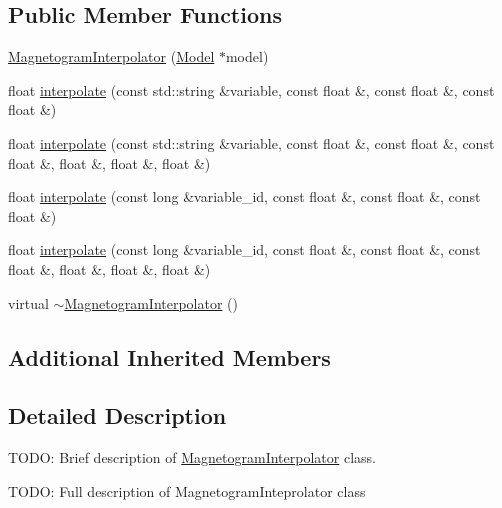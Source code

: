 \subsection*{Public Member Functions}
\begin{DoxyCompactItemize}
\item 
\hyperlink{classccmc_1_1_magnetogram_interpolator_a7e03d3421beac2e3633b24224ec77e64}{Magnetogram\-Interpolator} (\hyperlink{classccmc_1_1_model}{Model} $\ast$model)
\item 
float \hyperlink{classccmc_1_1_magnetogram_interpolator_a6440daeed08522a385acdadf0cdbf304}{interpolate} (const std\-::string \&variable, const float \&, const float \&, const float \&)
\item 
float \hyperlink{classccmc_1_1_magnetogram_interpolator_a4786d2da7816ec47d59a3dadc7ffb589}{interpolate} (const std\-::string \&variable, const float \&, const float \&, const float \&, float \&, float \&, float \&)
\item 
float \hyperlink{classccmc_1_1_magnetogram_interpolator_acbcaa45bb002792e4357f3fa91f93e1a}{interpolate} (const long \&variable\-\_\-id, const float \&, const float \&, const float \&)
\item 
float \hyperlink{classccmc_1_1_magnetogram_interpolator_a9a36d83f432f40ab4813428f9b5cd9b3}{interpolate} (const long \&variable\-\_\-id, const float \&, const float \&, const float \&, float \&, float \&, float \&)
\item 
virtual \hyperlink{classccmc_1_1_magnetogram_interpolator_a37a31cf45e56003855866fd403d8af02}{$\sim$\-Magnetogram\-Interpolator} ()
\end{DoxyCompactItemize}
\subsection*{Additional Inherited Members}


\subsection{Detailed Description}
T\-O\-D\-O\-: Brief description of \hyperlink{classccmc_1_1_magnetogram_interpolator}{Magnetogram\-Interpolator} class. 

T\-O\-D\-O\-: Full description of Magnetogram\-Inteprolator class 

